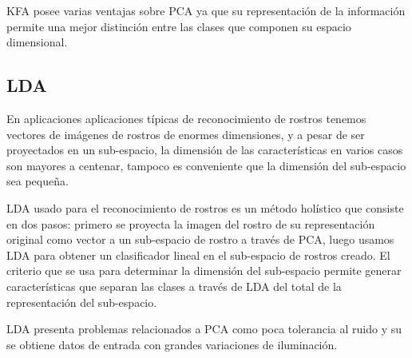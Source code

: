 \ac{KFA} posee varias ventajas sobre \ac{PCA} ya que su representación de la información permite una mejor distinción entre las clases que componen su espacio dimensional.

%

\subsection{\acf{LDA}}
En aplicaciones aplicaciones típicas de reconocimiento de rostros tenemos vectores de imágenes de rostros de enormes dimensiones, y a pesar de ser proyectados en un sub-espacio, la dimensión de las características en varios casos son mayores a centenar, tampoco es conveniente que la dimensión del sub-espacio sea pequeña. %

\ac{LDA} usado para el reconocimiento de rostros \cite{zhao1999subspace} es un método holístico que consiste en dos pasos: primero se proyecta la imagen del rostro de su representación original como vector a un sub-espacio de rostro a través de \ac{PCA}, luego usamos LDA para obtener un clasificador lineal en el sub-espacio de rostros creado. El criterio que se usa para determinar la dimensión del sub-espacio permite generar características que separan las clases a través de \ac{LDA} del total de la representación del sub-espacio.

\ac{LDA} presenta problemas relacionados a \ac{PCA} como poca tolerancia al ruido y su se obtiene datos de entrada con grandes variaciones de iluminación.


